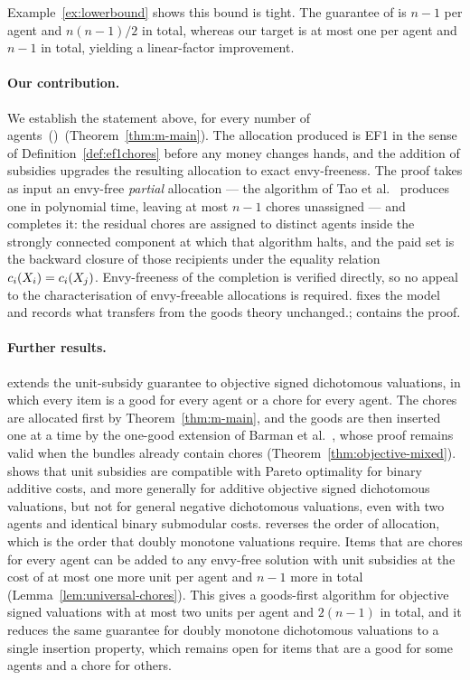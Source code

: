 Example~\ref{ex:lowerbound} shows this bound is tight. The guarantee of \cite{KMSTY24} is $n-1$ per agent and $n(n-1)/2$ in total, whereas our target is at most one per agent and $n-1$ in total, yielding a linear-factor improvement.


\paragraph{Our contribution.}
We establish the statement above, for every number of agents\ifworking\
()\else\ (Theorem~\ref{thm:m-main})\fi. The allocation
produced is EF1 in the sense of Definition~\ref{def:ef1chores} before any money
changes hands, and the addition of subsidies upgrades the resulting allocation to exact envy-freeness. The
proof takes as
input an envy-free \emph{partial} allocation --- the algorithm of Tao et
al.~\cite{TWYZ23} produces one in polynomial time, leaving at most $n-1$ chores
unassigned --- and completes it: the residual chores are assigned to distinct
agents inside the strongly connected component at which that algorithm halts,
and the paid set is the backward closure of those recipients under the equality
relation $c_i(X_i) = c_i(X_j)$. Envy-freeness of the completion is
verified directly, so no appeal to the characterisation of envy-freeable
allocations is required. \Cref{sec:prelim} fixes the model and records what
transfers from the goods theory unchanged\ifworking.\else; \Cref{sec:main}
contains the proof.\fi

\ifworking\else
\paragraph{Further results.}
 extends the unit-subsidy guarantee to objective
signed dichotomous valuations, in which every item is a good for every agent or a
chore for every agent. The chores are allocated first by
Theorem~\ref{thm:m-main}, and the goods are then inserted one at a time by the
one-good extension of Barman et al.~\cite{BKNS22}, whose proof remains valid when
the bundles already contain chores (Theorem~\ref{thm:objective-mixed}).
\Cref{sec:pareto} shows that unit subsidies are compatible with Pareto
optimality for binary additive costs, and more generally for additive objective
signed dichotomous valuations, but not for general negative dichotomous
valuations, even with two agents and identical binary submodular costs.
\Cref{sec:goods-first} reverses the order of allocation, which is the order that
doubly monotone valuations require. Items that are chores for every agent can be
added to any envy-free solution with unit subsidies at the cost of at most one
more unit per agent and $n-1$ more in total (Lemma~\ref{lem:universal-chores}).
This gives a goods-first algorithm for objective signed valuations with at most
two units per agent and $2(n-1)$ in total, and it reduces the same guarantee for
doubly monotone dichotomous valuations to a single insertion property, which
remains open for items that are a good for some agents and a chore for others.
\fi

